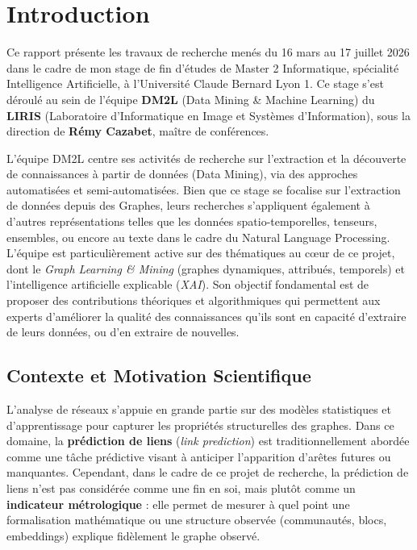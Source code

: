 \section{Introduction}
\label{sec:introduction}

Ce rapport présente les travaux de recherche menés du 16 mars au 17 juillet 2026 dans le cadre de mon stage de fin d'études de Master 2 Informatique, spécialité Intelligence Artificielle, à l'Université Claude Bernard Lyon 1. Ce stage s'est déroulé au sein de l'équipe \textbf{DM2L} (Data Mining \& Machine Learning) du \textbf{LIRIS} (Laboratoire d'Informatique en Image et Systèmes d'Information), sous la direction de \textbf{Rémy Cazabet}, maître de conférences. 

L'équipe DM2L centre ses activités de recherche sur l'extraction et la découverte de connaissances à partir de données (Data Mining), via des approches  automatisées et semi-automatisées. Bien que ce stage se focalise sur l'extraction de données depuis des Graphes, leurs recherches s'appliquent également à d'autres représentations telles que les données spatio-temporelles, tenseurs, ensembles, ou encore au texte dans le cadre du Natural Language Processing. L'équipe est particulièrement active sur des thématiques au cœur de ce projet, dont le \textit{Graph Learning \& Mining} (graphes dynamiques, attribués, temporels) et l'intelligence artificielle explicable (\textit{XAI}). Son objectif fondamental est de proposer des contributions théoriques et algorithmiques qui permettent aux experts d'améliorer la qualité des connaissances qu'ils sont en capacité d'extraire de leurs données, ou d'en extraire de nouvelles.


\subsection{Contexte et Motivation Scientifique}
L'analyse de réseaux s'appuie en grande partie sur des modèles statistiques et d'apprentissage pour capturer les propriétés structurelles des graphes. Dans ce domaine, la \textbf{prédiction de liens} (\textit{link prediction}) est traditionnellement abordée comme une tâche prédictive visant à anticiper l'apparition d'arêtes futures ou manquantes. Cependant, dans le cadre de ce projet de recherche, la prédiction de liens n'est pas considérée comme une fin en soi, mais plutôt comme un \textbf{indicateur métrologique} : elle permet de mesurer à quel point une formalisation mathématique ou une structure observée (communautés, blocs, embeddings) explique fidèlement le graphe observé.

